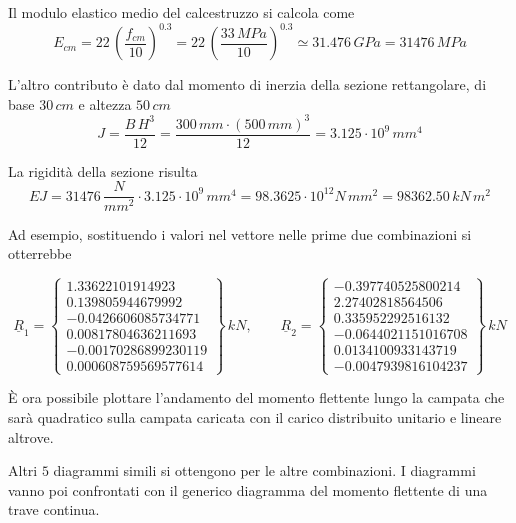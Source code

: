 Il modulo elastico medio del calcestruzzo si calcola come
\[
	E_{cm} = 22\,\left(\dfrac{f_{cm}}{10}\right)^{0.3} = 22\,\left(\dfrac{33\,MPa}{10}\right)^{0.3} \simeq 31.476\,GPa = 31476\,MPa
\]

L'altro contributo è dato dal momento di inerzia della sezione rettangolare, di base $30\,cm$ e altezza $50\,cm$
\[
	J = \dfrac{B\,H^3}{12} = \dfrac{300\,mm\cdot (500\,mm)^3}{12} = 3.125\cdot 10^9\, mm^4
\]

La rigidità della sezione risulta
\[
	EJ = 31476\,\dfrac{N}{mm^2}\cdot 3.125\cdot 10^9\,mm^4 = 98.3625\cdot 10^{12} N\,mm^2 = 98362.50\,kN\,m^2
\]

Ad esempio, sostituendo i valori nel vettore nelle prime due combinazioni si otterrebbe

\begin{equation*}
	\underline{R}_1 = 
	\begin{Bmatrix}
		1.33622101914923\\0.139805944679992\\-0.0426606085734771\\0.00817804636211693\\-0.00170286899230119\\0.000608759569577614
	\end{Bmatrix}\,kN,\qquad 
	\underline{R}_2 = \begin{Bmatrix}
		-0.397740525800214\\2.27402818564506\\0.335952292516132\\-0.0644021151016708\\0.0134100933143719\\-0.0047939816104237
	\end{Bmatrix}\,kN
\end{equation*}

È ora possibile plottare l'andamento del momento flettente lungo la campata che sarà quadratico sulla campata caricata con il carico distribuito unitario e lineare altrove.

Altri $5$ diagrammi simili si ottengono per le altre combinazioni. I diagrammi vanno poi confrontati con il generico diagramma del momento flettente di una trave continua.

